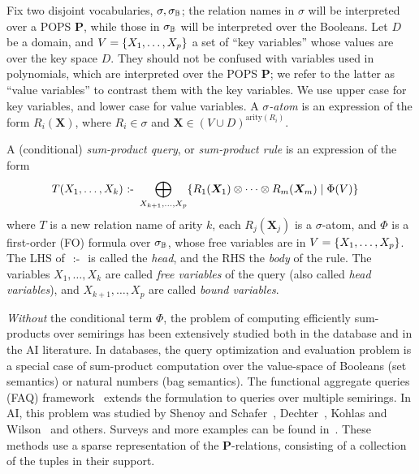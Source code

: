Fix two disjoint vocabularies, $\sigma, \sigma_\mathbb B$; the relation names
in $\sigma$ will be interpreted over a POPS $\bm P$, while those in
$\sigma_\mathbb B$ will be interpreted over the Booleans.  Let $D$ be a
domain, and $V = \{X_1, \ldots, X_p\}$ a set of ``key variables''
whose values are over the key space $D$. They should not be
confused with variables used in polynomials, which are interpreted
over the POPS $\bm P$; we refer to the latter as ``value variables'' to
contrast them with
the key variables.
We use upper case for key variables, and
lower case for value variables.  A {\em $\sigma$-atom} is an expression
of the form $R_i(\bm X)$, where $R_i \in \sigma$ and $\bm X \in (V \cup D)^{\text{arity}(R_i)}$.

\begin{defn} \label{def:sum:product} A (conditional) {\em sum-product query}, or
{\em sum-product rule} is an expression of the form
%
  \begin{align}
    T(X_1, \ldots, X_k) &\text{ :- } \bigoplus_{X_{k+1}, \ldots,X_p} \{{R_1(\bm X_1) \otimes
    \cdots \otimes R_m(\bm X_m)}\mid{\Phi(V)}\}  \label{eq:t:monomial}
  \end{align}
%
  where $T$ is a new relation name of arity $k$, each $R_j(\bm X_j)$
  is a $\sigma$-atom, and $\Phi$ is a first-order (FO) formula over
  $\sigma_\mathbb B$, whose free variables are in
  $V = \{X_1, \ldots, X_p\}$.  The LHS of $\text{ :- }$ is called the {\em
    head}, and the RHS the {\em body} of the rule.  The variables
  $X_1, \ldots, X_k$ are called {\em free variables} of the query
  (also called {\em head variables}), and $X_{k+1}, \ldots, X_p$ are
  called {\em bound variables}.
\end{defn}

{\em Without} the conditional term $\Phi$,
the problem of computing efficiently sum-products over semirings has
been extensively studied both in the database and in the AI
literature. In databases, the query optimization and evaluation
problem is a special case of sum-product computation over the
value-space of Booleans (set semantics) or natural numbers (bag
semantics). The functional aggregate queries (FAQ)
framework~\cite{DBLP:conf/pods/KhamisNR16} extends the formulation to
queries over multiple semirings. In AI, this problem was studied by
Shenoy and Schafer~\cite{DBLP:conf/uai/ShenoyS88},
Dechter~\cite{DBLP:journals/constraints/Dechter97}, Kohlas and
Wilson~\cite{DBLP:journals/ai/KohlasW08} and others.  Surveys and more
examples can be found
in~\cite{DBLP:journals/tit/AjiM00,DBLP:books/daglib/0008195}.  These
methods use a sparse representation of the $\bm P$-relations,
consisting of a collection of the tuples in their support.

